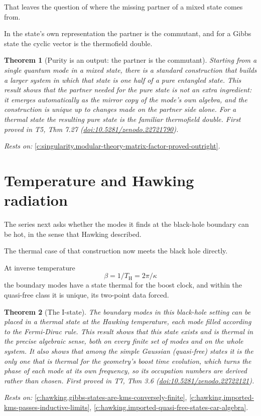 \documentclass[11pt]{article}
\newtheorem{theorem}{Theorem}[section]
\theoremstyle{definition}
\theoremstyle{plain}
\providecommand{\TH}{}\renewcommand{\TH}{T_{\mathrm{H}}}
\begin{document}
That leaves the question of where the missing partner of a mixed state comes from.

In the state's own representation the partner is the commutant, and for a Gibbs state the cyclic vector is the thermofield double.

\begin{theorem}[Purity is an output: the partner is the commutant]\label{c:singularity.purity-output-partner-commutant}
Starting from a single quantum mode in a mixed state, there is a standard construction that builds a larger system in which that state is one half of a pure entangled state. This result shows that the partner needed for the pure state is not an extra ingredient: it emerges automatically as the mirror copy of the mode's own algebra, and the construction is unique up to changes made on the partner side alone. For a thermal state the resulting pure state is the familiar thermofield double.
\emph{First proved in} T5, Thm 7.27 (\href{https://doi.org/10.5281/zenodo.22721790}{doi:10.5281/zenodo.22721790}).
\end{theorem}
\noindent\emph{Rests on:} \ref{c:singularity.modular-theory-matrix-factor-proved-outright}.

\section{Temperature and Hawking radiation}

The series next asks whether the modes it finds at the black-hole boundary can be hot, in the sense that Hawking described.

The thermal case of that construction now meets the black hole directly.

At inverse temperature \[ \beta = 1/\TH = 2\pi/\kappa \] the boundary modes have a state thermal for the boost clock, and within the quasi-free class it is unique, its two-point data forced.

\begin{theorem}[The I-state]\label{c:hawking.i-state}
The boundary modes in this black-hole setting can be placed in a thermal state at the Hawking temperature, each mode filled according to the Fermi-Dirac rule. This result shows that this state exists and is thermal in the precise algebraic sense, both on every finite set of modes and on the whole system. It also shows that among the simple Gaussian (quasi-free) states it is the only one that is thermal for the geometry's boost time evolution, which turns the phase of each mode at its own frequency, so its occupation numbers are derived rather than chosen.
\emph{First proved in} T7, Thm 3.6 (\href{https://doi.org/10.5281/zenodo.22722121}{doi:10.5281/zenodo.22722121}).
\end{theorem}
\noindent\emph{Rests on:} \ref{c:hawking.gibbs-states-are-kms-conversely-finite}, \ref{c:hawking.imported-kms-passes-inductive-limits}, \ref{c:hawking.imported-quasi-free-states-car-algebra}.
\end{document}

